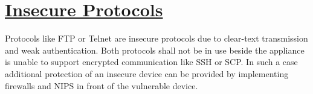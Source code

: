 %
%
%

\setlength{\parindent}{0pt}
\chapter[Insecure Protocols]{\underline{Insecure Protocols}}
\begin{flushleft}
Protocols like FTP or Telnet are insecure protocols due to clear-text transmission and weak authentication. Both protocols shall not be in use beside the appliance is unable to support encrypted communication like SSH or SCP. In such a case additional protection of an insecure device can be provided by implementing firewalls and NIPS in front of the vulnerable device.

\end{flushleft}

